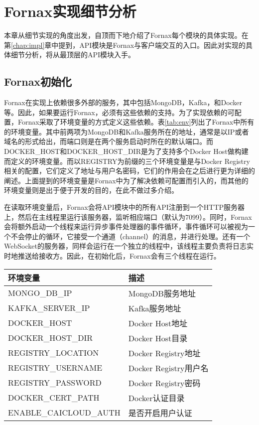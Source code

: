 \chapter{Fornax实现细节分析}
\label{chap:detail}

本章从细节实现的角度出发，自顶而下地介绍了Fornax每个模块的具体实现。在第\ref{chap:impl}章中提到，API模块是Fornax与客户端交互的入口。因此对实现的具体细节分析，将从最顶层的API模块入手。


\section{Fornax初始化}

Fornax在实现上依赖很多外部的服务，其中包括MongoDB，Kafka，和Docker等。因此，如果要运行Fornax，必须有这些依赖的支持。为了实现依赖的可配置，Fornax采取了环境变量的方式定义这些依赖。表\ref{tab:env}列出了Fornax中所有的环境变量。其中前两项为MongoDB和Kafka服务所在的地址，通常是以IP或者域名的形式给出，而端口则是在两个服务启动时所在的默认端口。而DOCKER\_HOST和DOCKER\_HOST\_DIR是为了支持多个Docker Host做构建而定义的环境变量。而以REGISTRY为前缀的三个环境变量是与Docker Registry相关的配置，它们定义了地址与用户名密码，它们的作用会在之后进行更为详细的阐述。上面提到的环境变量是Fornax中为了解决依赖可配置而引入的，而其他的环境变量则是出于便于开发的目的，在此不做过多介绍。

在读取环境变量后，Fornax会将API模块中的所有API注册到一个HTTP服务器上，然后在主线程里运行该服务器，监听相应端口（默认为7099）。同时，Fornax会将额外启动一个线程来运行异步事件处理器的事件循环，事件循环可以被视为一个不会停止的循环，它接受一个通道（channel）的消息，并进行处理。还有一个WebSocket的服务器，同样会运行在一个独立的线程中，该线程主要负责将日志实时地推送给接收方。因此，在初始化后，Fornax会有三个线程在运行。

\begin{table}[!hpb]
  \centering
  \begin{tabular}{ll} \toprule
    环境变量 & 描述 \\ \midrule
    MONGO\_DB\_IP & MongoDB服务地址 \\
    KAFKA\_SERVER\_IP & Kafka服务地址  \\
    DOCKER\_HOST & Docker Host地址  \\
    DOCKER\_HOST\_DIR & Docker Host目录 \\
    REGISTRY\_LOCATION & Docker Registry地址  \\
    REGISTRY\_USERNAME & Docker Registry用户名  \\
    REGISTRY\_PASSWORD & Docker Registry密码  \\
    DOCKER\_CERT\_PATH & Docker认证目录  \\
    ENABLE\_CAICLOUD\_AUTH & 是否开启用户认证  \\ \bottomrule
  \end{tabular}
\end{table}

